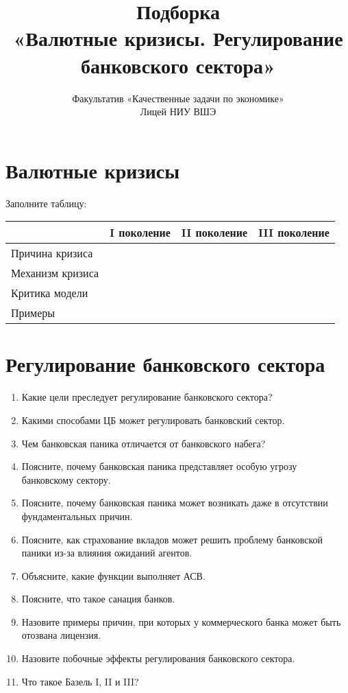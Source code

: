 \documentclass[10pt, a4paper]{extarticle}
\title{Подборка \\ «Валютные кризисы. Регулирование банковского сектора»}
\author{Факультатив «Качественные задачи по экономике» \\ Лицей НИУ ВШЭ}
\begin{document}
\maketitle

\section{Валютные кризисы}
Заполните таблицу:

\def\arraystretch{3}
\begin{center}
\begin{tabular}{l|C{4cm}|C{4cm}|C{4cm}}
	&I поколение & II поколение & III поколение \\[1.8ex]
	\hline
	Причина кризиса &&&  \\ 
	Механизм кризиса &&& \\
	Критика модели &&& \\
	Примеры &&&
\end{tabular}
\end{center}

\section{Регулирование банковского сектора}
\begin{enumerate}[label=\alph*)]
	\item Какие цели преследует регулирование банковского сектора?
	\item Какими способами ЦБ может регулировать банковский сектор.
	\item Чем банковская паника отличается от банковского набега?
	\item Поясните, почему банковская паника представляет особую угрозу банковскому сектору.
	\item Поясните, почему банковская паника может возникать даже в отсутствии фундаментальных причин.
	\item Поясните, как страхование вкладов может решить проблему банковской паники из-за влияния ожиданий агентов.
	\item Объясните, какие функции выполняет АСВ.
	\item Поясните, что такое санация банков.
	\item Назовите примеры причин, при которых у коммерческого банка может быть отозвана лицензия.
	\item Назовите побочные эффекты регулирования банковского сектора.
	\item Что такое Базель I, II и III?
\end{enumerate}
\end{document}
